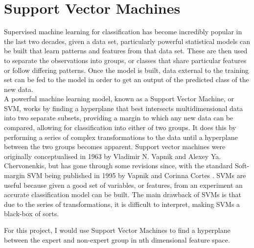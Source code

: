 \documentclass{report}
\begin{document}
{		\section{Support Vector Machines} \label{svms}
			Supervised machine learning for classification has become incredibly popular in the last two decades, given a data set, particularly powerful statistical models can be built that learn patterns and features from that data set. These are then used to separate the observations into groups, or classes that share particular features or follow differing patterns. Once the model is built, data external to the training set can be fed to the model in order to get an output of the predicted class of the new data.\\
			A powerful machine learning model, known as a Support Vector Machine, or SVM, works by finding a hyperplane that best intersects multidimensional data into two separate subsets, providing a margin to which any new data can be compared, allowing for classification into either of two groups. It does this by performing a series of complex transformations to the data until a hyperplane between the two groups becomes apparent. Support vector machines were originally conceptualised in 1963 by Vladimir N. Vapnik and Alexey Ya. Chervonenkis, but has gone through some revisions since, with the standard Soft-margin SVM being published in 1995 by Vapnik and Corinna Cortes \cite{vapnik-svms}. SVMs are useful because given a good set of variables, or features, from an experiment an accurate classification model can be built. The main drawback of SVMs is that due to the series of transformations, it is difficult to interpret, making SVMs a black-box of sorts.
			
			For this project, I would use Support Vector Machines to find a hyperplane between the expert and non-expert group in nth dimensional feature space.
}
\end{document}
